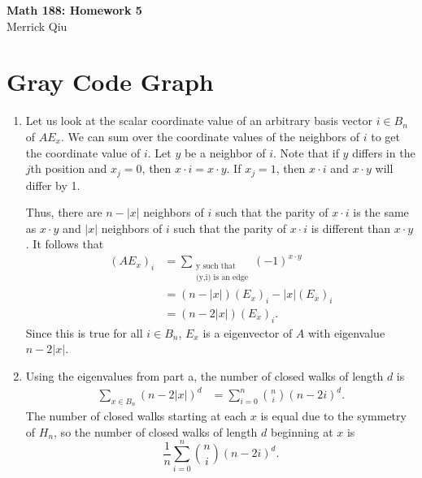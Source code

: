 \documentclass{article}
\begin{document}
\begin{center}
	\huge{\bf Math 188: Homework 5} \\
	Merrick Qiu
\end{center}

\section{Gray Code Graph}
   \begin{enumerate}
      \item 
      Let us look at the scalar coordinate value of an arbitrary 
      basis vector $i \in B_n$ of $AE_x$.
      We can sum over the coordinate values of the neighbors of $i$
      to get the coordinate value of $i$.
      Let $y$ be a neighbor of $i$.
      Note that if $y$ differs in the $j$th position 
      and $x_j = 0$, then $x\cdot i=x\cdot y$. 
      If $x_j = 1$, then
      $x\cdot i$ and $x\cdot y$ will differ by 1.

      Thus, there are $n-|x|$ neighbors of $i$ such that the parity of 
      $x\cdot i$ is the same as $x\cdot y$
      and $|x|$ neighbors of $i$ such that the parity of 
      $x\cdot i$ is different than $x\cdot y$.
      It follows that
      \begin{align*}
         (AE_x)_i &= \sum_{\substack{\text{y such that}\\ \text{(y,i) is an edge}}} (-1)^{x\cdot y} \\
         &= (n-|x|)(E_x)_i - |x|(E_x)_i \\
         &= (n-2|x|)(E_x)_i.
      \end{align*}
      Since this is true for all $i \in B_n$, 
      $E_x$ is a eigenvector of $A$ with eigenvalue $n-2|x|$. 
      \item Using the eigenvalues from part a, 
      the number of closed walks of length $d$ is 
      \begin{align*}
         \sum_{x \in B_n} (n - 2|x|)^d
         &= \sum_{i=0}^n \binom{n}{i} (n - 2i)^d.
      \end{align*}
      The number of closed walks starting at each $x$ is equal due to the symmetry of $H_n$,
      so the number of closed walks of length $d$ beginning at $x$ is 
      \[
         \frac{1}{n} \sum_{i=0}^n \binom{n}{i} (n - 2i)^d.
      \]
   \end{enumerate}
   \newpage 
\end{document}
